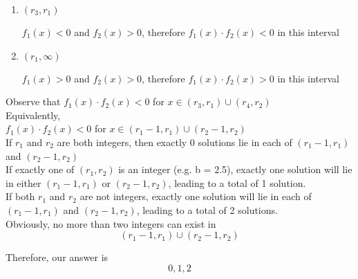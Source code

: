 \documentclass[11pt, letterpaper]{article}
\begin{document}
\begin{solution}{5}
\begin{enumerate}
\item $(r_3,r_1)$

$f_1(x) < 0$ and $f_2(x) > 0$, therefore $f_1(x)\cdot f_2(x) < 0$ in this interval

\item $(r_1,\infty)$

$f_1(x) > 0$ and $f_2(x) > 0$, therefore $f_1(x)\cdot f_2(x) > 0$ in this interval

\end{enumerate}



Observe that $f_1(x) \cdot f_2(x) < 0$ for $x \in (r_3,r_1) \cup (r_4,r_2)$\\

Equivalently,\\

$f_1(x) \cdot f_2(x) < 0$ for $x \in (r_1-1,r_1) \cup (r_2-1,r_2)$\\

If $r_1$ and $r_2$ are both integers, then exactly 0 solutions lie in each of $(r_1-1,r_1)$ and $(r_2-1,r_2)$\\

If exactly one of $(r_1, r_2)$ is an integer (e.g. b = 2.5), exactly one solution will lie in either $(r_1-1,r_1)$ or $(r_2-1,r_2)$, leading to a total of 1 solution. \\

If both $r_1$ and $r_2$ are not  integers, exactly one solution will lie in each of $(r_1-1,r_1)$ and $(r_2-1,r_2)$, leading to a total of 2 solutions. \\

Obviously, no more than two integers can exist in $$(r_1-1,r_1) \cup (r_2-1,r_2)$$

Therefore, our answer is $$\boxed{0,1,2}$$


\end{solution}
\end{document}
